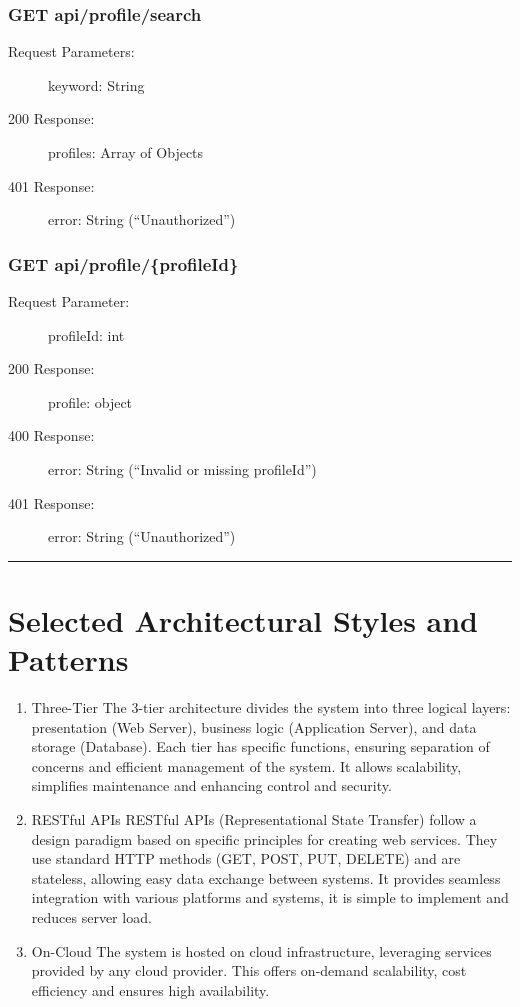 \documentclass{Configuration_Files/Template}
\begin{document}
\subsubsection{GET api/profile/search}
\begin{description}
    \item[Request Parameters:] keyword: String
    \item[200 Response:] profiles: Array of Objects
    \item[401 Response:] error: String (“Unauthorized”)
\end{description}

\subsubsection{GET api/profile/\{profileId\}}
\begin{description}
    \item[Request Parameter:] profileId: int
    \item[200 Response:] profile: object
    \item[400 Response:] error: String (“Invalid or missing profileId”)
    \item[401 Response:] error: String (“Unauthorized”)
\end{description}

{\color{bluepoli}\rule{\linewidth}{0.1pt}}

\section{Selected Architectural Styles and Patterns}

\begin{enumerate}
    \item \textcolor{bluepoli}{Three-Tier} The 3-tier architecture divides the system into three logical layers: presentation (Web Server), business logic (Application Server), and data storage (Database). Each tier has specific functions, ensuring separation of concerns and efficient management of the system. It allows scalability, simplifies maintenance and enhancing control and security. 
    \item \textcolor{bluepoli}{RESTful APIs} RESTful APIs (Representational State Transfer) follow a design paradigm based on specific principles for creating web services. They use standard HTTP methods (GET, POST, PUT, DELETE) and are stateless, allowing easy data exchange between systems. It provides seamless integration with various platforms and systems, it is simple to implement and reduces server load.
    \item \textcolor{bluepoli}{On-Cloud} The system is hosted on cloud infrastructure, leveraging services provided by any cloud provider. This offers on-demand scalability, cost efficiency and ensures high availability.
\end{enumerate}
\end{document}
